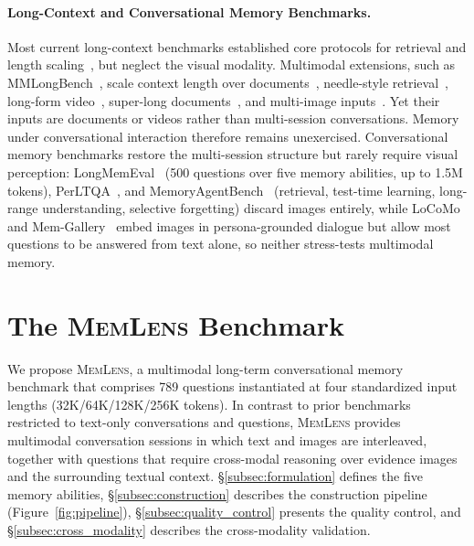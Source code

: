 \documentclass{llmxive}
\providecommand{\bench}{\textsc{MemLens}}
\begin{document}
\paragraph{Long-Context and Conversational Memory Benchmarks.}
Most current long-context benchmarks established core protocols for retrieval and length scaling~\cite{bai2024longbench,bai2024longbenchv2,hsiehruler,yen2024helmet,an2024eval,zhang2024bench,li2024needlebench}, but neglect the visual modality. Multimodal extensions, such as MMLongBench~\citep{mmlongbench}, scale context length over documents~\cite{mmlongbench,ma2024mmlongbenchdocbenchmarkinglongcontextdocument}, needle-style retrieval~\cite{wang2024needlemultimodalhaystack,wang2025multimodalneedlehaystackbenchmarking}, long-form video~\cite{zhou2025mlvubenchmarkingmultitasklong,wu2024longvideobenchbenchmarklongcontextinterleaved}, super-long documents~\cite{deng2024longdocurl,chiam}, and multi-image inputs~\cite{wang2024divscene,song2024milebench,wang2024longllava,ye2024mplug}. Yet their inputs are documents or videos rather than multi-session conversations. Memory under conversational interaction therefore remains unexercised. Conversational memory benchmarks restore the multi-session structure but rarely require visual perception: LongMemEval~\cite{wu2025longmemevalbenchmarkingchatassistants} (500 questions over five memory abilities, up to 1.5M tokens), PerLTQA~\cite{du2024perltqapersonallongtermmemory}, and MemoryAgentBench~\cite{memoryagentbench} (retrieval, test-time learning, long-range understanding, selective forgetting) discard images entirely, while LoCoMo~\cite{maharana2024evaluatinglongtermconversationalmemory} and Mem-Gallery~\cite{memgallery} embed images in persona-grounded dialogue but allow most questions to be answered from text alone, so neither stress-tests multimodal memory.


\section{The \bench{} Benchmark}
\label{sec:benchmark}
We propose \bench{}, a multimodal long-term conversational memory benchmark that comprises 789 questions instantiated at four standardized input lengths (32K/64K/128K/256K tokens). In contrast to prior benchmarks restricted to text-only conversations and questions, \bench{} provides multimodal conversation sessions in which text and images are interleaved, together with questions that require cross-modal reasoning over evidence images and the surrounding textual context.
\S\ref{subsec:formulation} defines the five memory abilities, \S\ref{subsec:construction} describes the construction pipeline (Figure~\ref{fig:pipeline}), \S\ref{subsec:quality_control} presents the quality control, and  \S\ref{subsec:cross_modality} describes the cross-modality validation.
\end{document}
